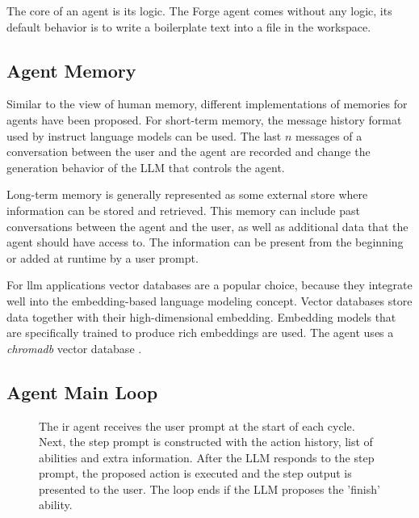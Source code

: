 \documentclass[../main.tex]{subfiles}
\begin{document}
The core of an agent is its logic.
The Forge agent comes without any logic, its default behavior is to write a boilerplate text into a file in the workspace.


\subsection{Agent Memory}

Similar to the view of human memory,
different implementations of memories for agents have been proposed.
For short-term memory,
the message history format used by instruct language models can be used.
The last $n$ messages of a conversation between the user and the agent
are recorded and change the generation behavior of the LLM that controls the agent.

Long-term memory is generally represented as some external store
where information can be stored and retrieved.
This memory can include past conversations between the agent and the user,
as well as additional data that the agent should have access to.
The information can be present from the beginning or added at runtime by a user prompt.

For \gls{llm} applications vector databases are a popular choice,
because they integrate well into the embedding-based language modeling concept.
Vector databases store data together with their high-dimensional embedding.
Embedding models that are specifically trained to produce rich embeddings are used.
The agent uses a \emph{chromadb} vector database \autocite{zotero-176}.


\subsection{Agent Main Loop}

\begin{figure}[t]
    \centering
    \caption{The \gls{ir} agent receives the user prompt at the start of each cycle.
        Next, the step prompt is constructed with the action history, list of abilities and extra information.
        After the LLM responds to the step prompt, the proposed action is executed
        and the step output is presented to the user.
        The loop ends if the LLM proposes the 'finish' ability.}
    \label{fig:agent_loop}
\end{figure}
\end{document}
